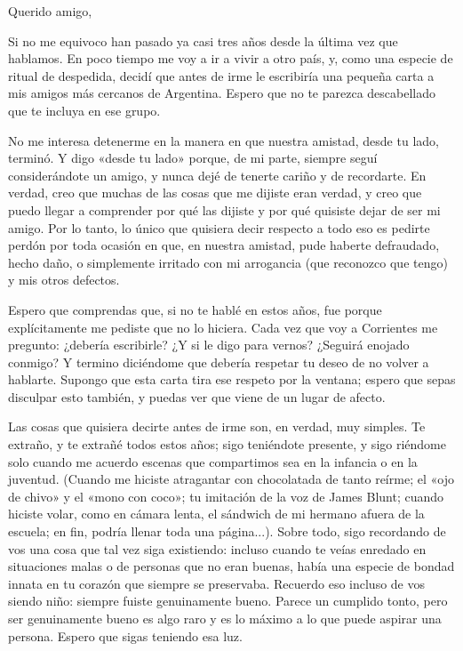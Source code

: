 \documentclass[a4paper]{article}
\begin{document}
    

Querido amigo,

Si no me equivoco han pasado ya casi tres años desde la última vez que hablamos. En
poco tiempo me voy a ir a vivir a otro país, y, como una especie de ritual de
despedida, decidí que antes de irme le escribiría una pequeña carta a mis amigos
más cercanos de Argentina. Espero que no te parezca descabellado que te incluya
en ese grupo.

No me interesa detenerme en la manera en que nuestra amistad, desde tu lado,
terminó. Y digo «desde tu lado» porque, de mi parte, siempre seguí
considerándote un amigo, y nunca dejé de tenerte cariño y de recordarte. En
verdad, creo que muchas de las cosas que me dijiste eran verdad, y creo que puedo
llegar a comprender por qué las dijiste y por qué quisiste dejar de ser mi
amigo. Por lo tanto, lo único que quisiera decir respecto a todo eso es pedirte
perdón por toda ocasión en que, en nuestra amistad, pude haberte defraudado,
hecho daño, o simplemente irritado con mi arrogancia (que reconozco que
tengo) y mis otros defectos.

Espero que comprendas que, si no te hablé en estos años, fue porque
explícitamente me pediste que no lo hiciera. Cada vez que voy a Corrientes me
pregunto: ¿debería escribirle? ¿Y si le digo para vernos? ¿Seguirá enojado
conmigo? Y termino diciéndome que debería respetar tu deseo de no volver a
hablarte. Supongo que esta carta tira ese respeto por la ventana; espero que
sepas disculpar esto también, y puedas ver que viene de un lugar de afecto.

Las cosas que quisiera decirte antes de irme son, en verdad, muy simples. Te
extraño, y te extrañé todos estos años; sigo teniéndote presente, y sigo
riéndome solo cuando me acuerdo escenas que compartimos sea en la infancia o en
la juventud. (Cuando me hiciste atragantar con chocolatada de tanto reírme; el
«ojo de chivo» y el «mono con coco»; tu imitación de la voz de James Blunt;
cuando hiciste volar, como en cámara lenta, el sándwich de mi hermano afuera de
la escuela; en fin, podría llenar toda una página...). Sobre todo, sigo
recordando de vos una cosa que tal vez siga existiendo: incluso
cuando te veías enredado en situaciones malas o de personas que no eran buenas,
había una especie de bondad innata en tu corazón que siempre se preservaba.
Recuerdo eso incluso de vos siendo niño: siempre fuiste genuinamente bueno.
Parece un cumplido tonto, pero ser genuinamente bueno es algo raro y es lo
máximo a lo que puede aspirar una persona. Espero que sigas teniendo esa luz.
\end{document}
